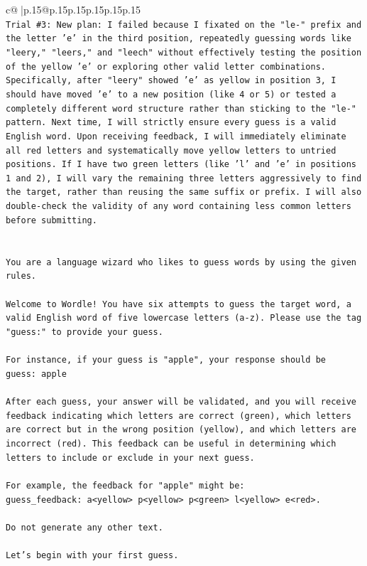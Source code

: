 \documentclass{article}
\begin{document}
{\begin{supertabular}{c@{$\;$}|p{.15\linewidth}@{}p{.15\linewidth}p{.15\linewidth}p{.15\linewidth}p{.15\linewidth}p{.15\linewidth}}
{{{\\ 
\texttt{Trial \#3: New plan: I failed because I fixated on the "le{-}" prefix and the letter 'e' in the third position, repeatedly guessing words like "leery," "leers," and "leech" without effectively testing the position of the yellow 'e' or exploring other valid letter combinations. Specifically, after "leery" showed 'e' as yellow in position 3, I should have moved 'e' to a new position (like 4 or 5) or tested a completely different word structure rather than sticking to the "le{-}" pattern. Next time, I will strictly ensure every guess is a valid English word. Upon receiving feedback, I will immediately eliminate all red letters and systematically move yellow letters to untried positions. If I have two green letters (like 'l' and 'e' in positions 1 and 2), I will vary the remaining three letters aggressively to find the target, rather than reusing the same suffix or prefix. I will also double{-}check the validity of any word containing less common letters before submitting.} \\
\\ 
\\ 
\texttt{You are a language wizard who likes to guess words by using the given rules.} \\
\\ 
\texttt{Welcome to Wordle! You have six attempts to guess the target word, a valid English word of five lowercase letters (a{-}z). Please use the tag "guess:" to provide your guess.} \\
\\ 
\texttt{For instance, if your guess is "apple", your response should be} \\
\texttt{guess: apple} \\
\\ 
\texttt{After each guess, your answer will be validated, and you will receive feedback indicating which letters are correct (green), which letters are correct but in the wrong position (yellow), and which letters are incorrect (red). This feedback can be useful in determining which letters to include or exclude in your next guess.} \\
\\ 
\texttt{For example, the feedback for "apple" might be:} \\
\texttt{guess\_feedback: a<yellow> p<yellow> p<green> l<yellow> e<red>.} \\
\\ 
\texttt{Do not generate any other text.} \\
\\ 
\texttt{Let's begin with your first guess.} \\
            }
        }
    }
     \\ \\


\end{supertabular}}
\end{document}
